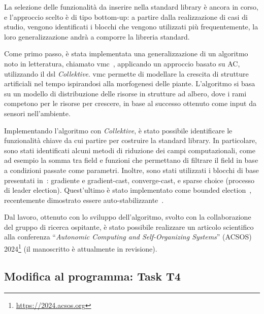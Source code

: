 \documentclass[13pt, a4paper]{article}
\newcommand{\ck}{\emph{Collektive}}
\begin{document}
La selezione delle funzionalità da inserire nella standard library
è ancora in corso,
e l'approccio scelto è di tipo bottom-up:
a partire dalla realizzazione di casi di studio,
vengono identificati i blocchi che vengono utilizzati più frequentemente,
la loro generalizzazione andrà a comporre la libreria standard.

Come primo passo,
è stata implementata una generalizzazione di un algoritmo noto in letteratura,
chiamato \ac{vmc}~\cite{ZahadatHS17},
applicando un approccio basato su \ac{AC}, utilizzando il \ac{dsl} \ck{}.
%
\ac{vmc} permette di modellare la crescita di strutture artificiali nel tempo ispirandosi alla morfogenesi delle piante.
%
L'algoritmo si basa su un modello di distribuzione delle risorse in strutture ad albero,
    dove i rami competono per le risorse per crescere, in base al successo ottenuto come input da sensori nell'ambiente.

Implementando l'algoritmo con \ck{},
è stato possibile identificare le funzionalità chiave da cui partire per costruire la standard library.
%
In particolare,
sono stati identificati alcuni metodi di riduzione dei campi computazionali, come ad esempio la somma tra field
e funzioni che permettano di filtrare il field in base a condizioni passate come parametri.
%
Inoltre, sono stati utilizzati i blocchi di base presentati in~\cite{TOMACS2018}:
gradiente e gradient-cast, converge-cast, e sparse choice (processo di leader election).
%
Quest'ultimo è stato implementato come bounded election~\cite{PianiniCV22},
recentemente dimostrato essere auto-stabilizzante~\cite{Dijkstra74}.

Dal lavoro,
ottenuto con lo sviluppo dell'algoritmo,
svolto con la collaborazione del gruppo di ricerca ospitante,
è stato possibile realizzare un articolo scientifico alla conferenza
``\emph{Autonomic Computing and Self-Organizing Systems}'' (ACSOS) 2024\footnote{\url{https://2024.acsos.org}}
(il manoscritto è attualmente in revisione).

\subsection{Modifica al programma: Task T4}\label{subsec:modifica-al-programma:-task-t4}
\end{document}
